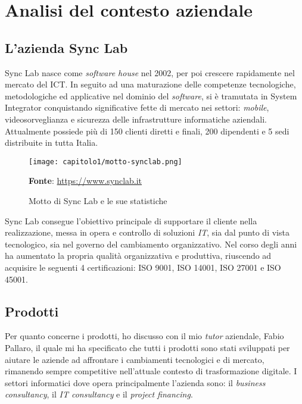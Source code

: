 
\chapter{Analisi del contesto aziendale}
\label{cap:contesto-aziendale}

\section{L'azienda Sync Lab}
Sync Lab nasce come \textit{software house} nel 2002, per poi crescere rapidamente nel mercato del \gls{ICT}. In seguito ad una maturazione delle competenze tecnologiche, metodologiche ed applicative nel dominio del \textit{software}, si è tramutata in \gls{System Integrator} conquistando significative fette di mercato nei settori: \textit{mobile}, videosorveglianza e sicurezza delle infrastrutture informatiche aziendali. Attualmente possiede più di 150 clienti diretti e finali, 200 dipendenti e 5 sedi distribuite in tutta Italia. 

\begin{figure}[!h]
  \centering
  \texttt{[image: capitolo1/motto-synclab.png]}
  \caption{Motto di Sync Lab e le sue statistiche}
  \textbf{Fonte}: \href{https://www.synclab.it}{https://www.synclab.it}
\end{figure}

Sync Lab consegue l'obiettivo principale di supportare il cliente nella realizzazione, messa in opera e controllo di soluzioni \textit{IT}, sia dal punto di vista tecnologico, sia nel governo del cambiamento organizzativo. Nel corso degli anni ha aumentato la propria qualità organizzativa e produttiva, riuscendo ad acquisire le seguenti 4 certificazioni: ISO 9001, ISO 14001, ISO 27001 e ISO 45001.

\section{Prodotti}
Per quanto concerne i prodotti, ho discusso con il mio \textit{tutor} aziendale, Fabio Pallaro, il quale mi ha specificato che tutti i prodotti sono stati sviluppati per aiutare le aziende ad affrontare i cambiamenti tecnologici e di mercato, rimanendo sempre competitive nell'attuale contesto di trasformazione digitale. I settori informatici dove opera principalmente l'azienda sono: il \textit{business consultancy}, il \textit{IT consultancy} e il \textit{project financing}.

